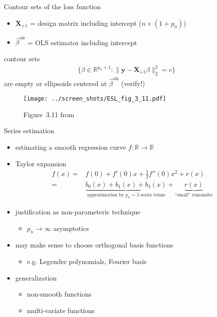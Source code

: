 \documentclass[xcolor=dvipsnames]{beamer}
\begin{document}
\begin{frame}{Contour sets of the loss function}    
\begin{itemize}
  \item 
  $\mathbf{X}_{+1}$ = design matrix including intercept ($n \times (1 + p_n)$)
  \item 
  $\hat{\beta}^{\text{ols}}$ = OLS estimator including intercept
\end{itemize}
contour sets 
\begin{align*}
\big\{
  \beta \in \mathbb{R}^{p_n + 1} : \lVert \mathbf{y} - \mathbf{X}_{+1} \beta \rVert_2^2 = c 
\big\}
\end{align*}
are empty or ellipsoids centered at $\hat{\beta}^{\text{ols}}$ (verify!)
\end{frame}

\begin{frame}
\begin{figure}
  \texttt{[image: ../screen\_shots/ESL\_fig\_3\_11.pdf]}
   \caption{Figure~3.11 from \textcite{hastie2009elements}}
\end{figure}
\end{frame}


\begin{frame}{Series estimation \parencite{newey1997convergence}}
\begin{itemize}
  \item<+-> estimating a smooth regression curve $f: \mathbb{R} \to \mathbb{R}$
  \item<+-> Taylor expansion 
  \begin{align*}
    f(x) =& f(0) + f'(0)x + \frac{1}{2} f''(0) x^2 + r(x)
  \\
    =& \underbrace{b_0(x) + b_1(x) + b_{3}(x)}_{\text{approximation by $p_n = 3$ series terms}} + \underbrace{r(x)}_{\text{``small'' remainder}}
  \end{align*}
  \item<+-> justification as non-parameteric technique
  \begin{itemize}
    \item 
    $p_n \to \infty$ asymptotics
  \end{itemize}
  \item<+-> may make sense to choose orthogonal basis functions
  \begin{itemize}
    \item e.g. Legendre polynomials, Fourier basis
  \end{itemize}
  \item<+-> generalization
  \begin{itemize}
    \item non-smooth functions 
    \item multi-variate functions
  \end{itemize}
\end{itemize}
\end{frame}
\end{document}
